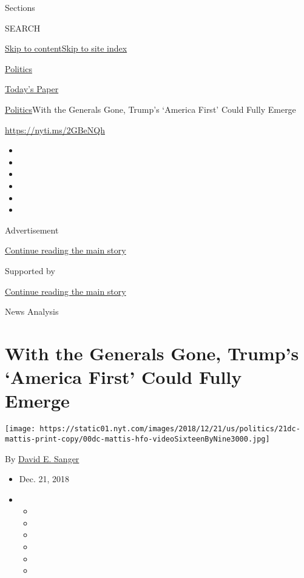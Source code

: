 Sections

SEARCH

\protect\hyperlink{site-content}{Skip to
content}\protect\hyperlink{site-index}{Skip to site index}

\href{https://www.nytimes.com/section/politics}{Politics}

\href{https://myaccount.nytimes.com/auth/login?response_type=cookie\&client_id=vi}{}

\href{https://www.nytimes.com/section/todayspaper}{Today's Paper}

\href{/section/politics}{Politics}\textbar{}With the Generals Gone,
Trump's `America First' Could Fully Emerge

\url{https://nyti.ms/2GBeNQh}

\begin{itemize}
\item
\item
\item
\item
\item
\item
\end{itemize}

Advertisement

\protect\hyperlink{after-top}{Continue reading the main story}

Supported by

\protect\hyperlink{after-sponsor}{Continue reading the main story}

News Analysis

\hypertarget{with-the-generals-gone-trumps-america-first-could-fully-emerge}{%
\section{With the Generals Gone, Trump's `America First' Could Fully
Emerge}\label{with-the-generals-gone-trumps-america-first-could-fully-emerge}}

\texttt{[image: https://static01.nyt.com/images/2018/12/21/us/politics/21dc-mattis-print-copy/00dc-mattis-hfo-videoSixteenByNine3000.jpg]}

By \href{https://www.nytimes.com/by/david-e-sanger}{David E. Sanger}

\begin{itemize}
\item
  Dec. 21, 2018
\item
  \begin{itemize}
  \item
  \item
  \item
  \item
  \item
  \item
  \end{itemize}
\end{itemize}

